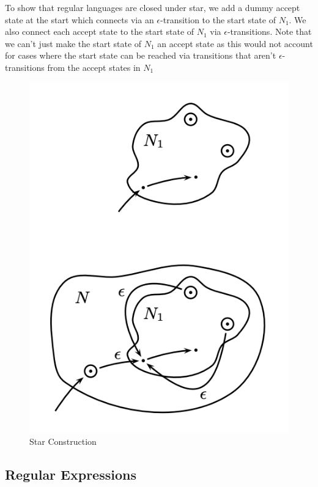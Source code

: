 \documentclass{article}
\begin{document}
    To show that regular languages are closed under star, we add a dummy accept state at the start which connects via an $\epsilon$-transition to the start state of $N_1$. We also connect each accept state to the start state of $N_1$ via $\epsilon$-transitions. Note that we can't just make the start state of $N_1$ an accept state as this would not account for cases where the start state can be reached via transitions that aren't $\epsilon$-transitions from the accept states in $N_1$

    \begin{figure}[H]
        \centering
        \includegraphics[scale=0.5]{images/star.png}
        \caption{Star Construction}
        \label{fig:star}
    \end{figure}

    \subsection{Regular Expressions}
\end{document}

